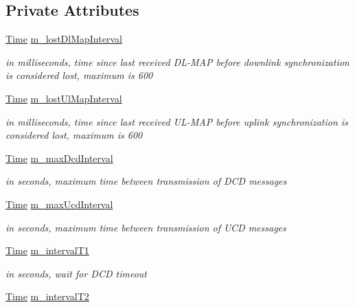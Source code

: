 \subsection*{Private Attributes}
\begin{DoxyCompactItemize}
\item 
\hyperlink{classns3_1_1Time}{Time} \hyperlink{classns3_1_1SubscriberStationNetDevice_a1a53a29f53c265f0f0e95efe12c23bf3}{m\+\_\+lost\+Dl\+Map\+Interval}
\begin{DoxyCompactList}\small\item\em in milliseconds, time since last received D\+L-\/\+M\+AP before downlink synchronization is considered lost, maximum is 600 \end{DoxyCompactList}\item 
\hyperlink{classns3_1_1Time}{Time} \hyperlink{classns3_1_1SubscriberStationNetDevice_a1d8057b7f7e209614d4546368fedadca}{m\+\_\+lost\+Ul\+Map\+Interval}
\begin{DoxyCompactList}\small\item\em in milliseconds, time since last received U\+L-\/\+M\+AP before uplink synchronization is considered lost, maximum is 600 \end{DoxyCompactList}\item 
\hyperlink{classns3_1_1Time}{Time} \hyperlink{classns3_1_1SubscriberStationNetDevice_ac4e6089589586089173858297042724a}{m\+\_\+max\+Dcd\+Interval}
\begin{DoxyCompactList}\small\item\em in seconds, maximum time between transmission of D\+CD messages \end{DoxyCompactList}\item 
\hyperlink{classns3_1_1Time}{Time} \hyperlink{classns3_1_1SubscriberStationNetDevice_aa1a8e6e9240a8bcc7efc734ed39b9f56}{m\+\_\+max\+Ucd\+Interval}
\begin{DoxyCompactList}\small\item\em in seconds, maximum time between transmission of U\+CD messages \end{DoxyCompactList}\item 
\hyperlink{classns3_1_1Time}{Time} \hyperlink{classns3_1_1SubscriberStationNetDevice_a6494e5839477efd3bf989e5ae8c72a64}{m\+\_\+interval\+T1}
\begin{DoxyCompactList}\small\item\em in seconds, wait for D\+CD timeout \end{DoxyCompactList}\item 
\hyperlink{classns3_1_1Time}{Time} \hyperlink{classns3_1_1SubscriberStationNetDevice_a1569e3230118e8fa0fabbc23d2acd5d9}{m\+\_\+interval\+T2}

\end{DoxyCompactItemize}
